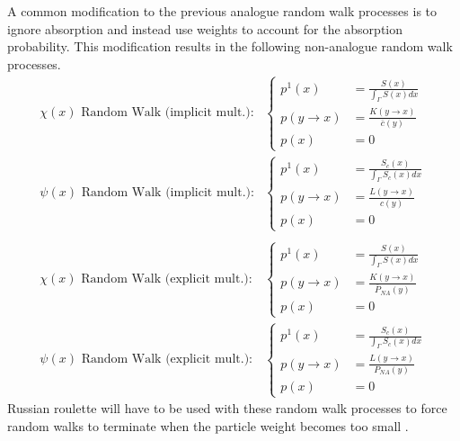 A common modification to the previous analogue random walk processes is to 
ignore absorption and instead use weights to account for the absorption 
probability. This modification results in the following non-analogue
random walk processes. 
\begin{align}
  \chi(x)\text{ Random Walk (implicit mult.):}&
  \begin{cases}
    p^1(x) & = \frac{S(x)}{\int_{\Gamma} S(x)dx} \\
    p(y \to x) &  = \frac{K(y \to x)}{\bar{c}(y)} \\
    p(x) & = 0
  \end{cases} \\
  \psi(x)\text{ Random Walk (implicit mult.):}&
  \begin{cases}
    p^1(x) & = \frac{S_c(x)}{\int_{\Gamma} S_c(x)dx} \\
    p(y \to x) & = \frac{L(y \to x) }{c(y)} \\
    p(x) & = 0
  \end{cases} \\
  \nonumber \\
  \chi(x)\text{ Random Walk (explicit mult.):}&
  \begin{cases}
    p^1(x) & = \frac{S(x)}{\int_{\Gamma} S(x)dx} \\
    p(y \to x) &  = \frac{K(y \to x)}{\overline{P}_{NA}(y)} \\
    p(x) & = 0
  \end{cases}
  \label{eq:mc_random_walk_emission_dens_nonan} \\
  \psi(x)\text{ Random Walk (explicit mult.):} &
  \begin{cases}
    p^1(x) & = \frac{S_c(x)}{\int_{\Gamma}S_c(x)dx} \\
    p(y \to x) & = \frac{L(y \to x)}{P_{NA}(y)} \\
    p(x) & = 0
  \end{cases}
  \label{eq:mc_random_walk_collision_dens_nonan}
\end{align}
Russian roulette will have to be used with these random walk processes to 
force random walks to terminate when the particle weight becomes too small
\citep{spanier_monte_1969}. 

